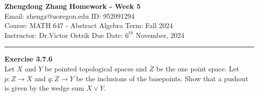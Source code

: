 \documentclass[a4paper, 12pt]{article}
\newenvironment{problem}[2][Exercise]
    { \begin{mdframed}[backgroundcolor=gray!20] \textbf{#1 #2} \\}
    {  \end{mdframed}}
\begin{document}
\noindent
\large\textbf{Zhengdong Zhang} \hfill \textbf{Homework - Week 5}   \\
Email: zhengz@uoregon.edu \hfill ID: 952091294 \\
\normalsize Course: MATH 647 - Abstract Algebra  \hfill Term: Fall 2024\\
Instructor: Dr.Victor Ostrik \hfill Due Date: $6^{th}$ November, 2024 \\
\noindent\rule{7in}{2.8pt}
\begin{problem}{3.7.6}
Let \(X\) and \(Y\) be pointed topological spaces and \(Z\) be the one point space. Let \(p:Z\rightarrow X\) and \(q:Z\rightarrow Y\) be the inclusions of the 
basepoints. Show that a pushout is given by the wedge sum \(X\vee  Y\).
\end{problem}
\end{document}
